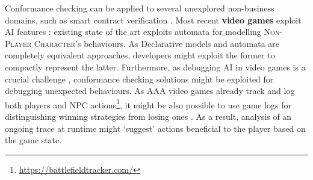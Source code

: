 %
{Conformance checking can be applied to several unexplored non-business domains, such as smart contract verification \cite{10.1007/978-3-031-08421-8_9}.} 
   Most recent \textbf{video games}  exploit AI features \cite{LiGT21}: existing state of the art exploits automata \cite{Miyake2017} for modelling \textsc{Non-Player Character}'s behaviours. As Declarative models and automata are completely equivalent approaches, developers might exploit the former to  compactly represent the latter. Furthermore, as debugging AI in video games is a crucial challenge \cite{john2019debugging}, conformance checking solutions might be exploited for debugging unexpected behaviours. As AAA video games already  track and log both players and NPC actions\footnote{\url{https://battlefieldtracker.com/}}, it might be also possible to use game logs for distinguishing winning strategies from losing ones \cite{mining}. As a result, analysis of an ongoing trace at runtime might `suggest'  actions beneficial to the player based on the game state.%

